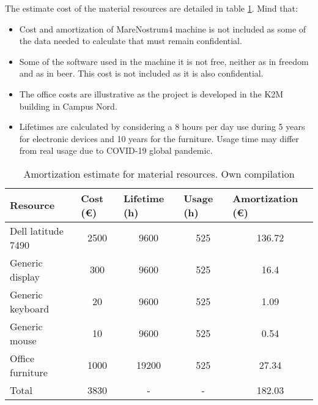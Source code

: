 The estimate cost of the material resources are detailed in table \ref{tab:amort}. Mind that:
\begin{itemize}
  \item Cost and amortization of MareNostrum4 machine is not included as some of the data needed to calculate that must remain confidential.
  \item Some of the software used in the machine it is not free, neither as in freedom and as in beer. This cost is not included as it is also confidential. 
  \item The office costs are illustrative as the project is developed in the K2M building in Campus Nord.
  \item Lifetimes are calculated by considering a 8 hours per day use during 5 years for electronic devices and 10 years for the furniture. Usage time may differ from real usage due to COVID-19 global pandemic. 
\end{itemize}


\begin{table}[htbp!]
\centering
\begin{tabular}{|l|c|c|c|c|}
\hline
Resource           & \multicolumn{1}{l|}{Cost (\euro)} & \multicolumn{1}{l|}{Lifetime (h)} & \multicolumn{1}{l|}{Usage (h)} & \multicolumn{1}{l|}{Amortization (\euro)} \\ \hline
Dell latitude 7490 & 2500                              & 9600                              & 525                            & 136.72                                    \\ \hline
Generic display    & 300                               & 9600                              & 525                            & 16.4                                      \\ \hline
Generic keyboard   & 20                                & 9600                              & 525                            & 1.09                                      \\ \hline
Generic mouse      & 10                                & 9600                              & 525                            & 0.54                                      \\ \hline
Office furniture   & 1000                              & 19200                             & 525                            & 27.34                                     \\ \hline
Total              & 3830                              & -                                 & -                              & 182.03                                    \\ \hline
\end{tabular}
\caption[Amortization estimate for material resources]{Amortization estimate for material resources. Own compilation}
\label{tab:amort}
\end{table}

